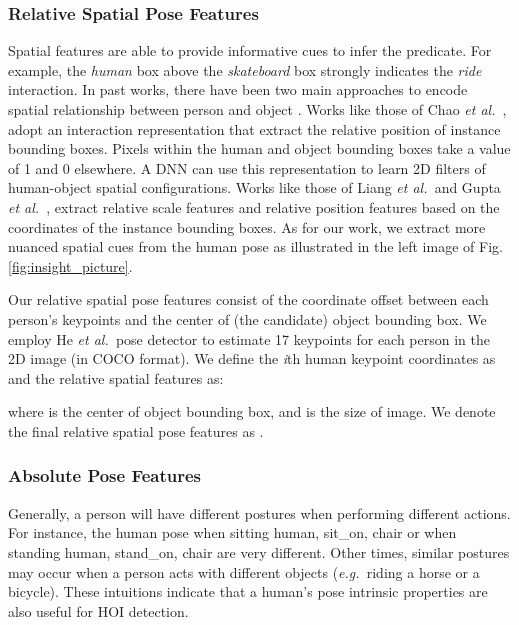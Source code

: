 \documentclass[10pt,twocolumn,letterpaper]{article}
\newcommand{\eg}{{\em e.g.\ }}
\newcommand{\et}{{\em et al.\ }}
\begin{document}
\subsubsection{Relative Spatial Pose Features}\label{subsubsec:rel_pose_feat} 
Spatial features are able to provide informative cues to infer the predicate. For example, the \textit{human} box above the \textit{skateboard} box strongly indicates the \textit{ride} interaction. 
In past works, there have been two main approaches to encode spatial relationship between person and object \cite{chao2018learning,gao2018ican,Li_2019_CVPR,wan2019pose}. 
Works like those of Chao \et \cite{chao2018learning}, adopt an interaction representation that extract the relative position of instance bounding boxes. Pixels within the human and object bounding boxes take a value of 1 and 0 elsewhere.  A DNN can use this representation to learn 2D filters of human-object spatial configurations. 
Works like those of Liang \et and Gupta \et \cite{liang2020visualsemantic,gupta2018nofrills}, extract relative scale features and relative position features based on the coordinates of the instance bounding boxes. 
As for our work, we extract more nuanced spatial cues from the human pose as illustrated in the left image of Fig. \ref{fig:insight_picture}.

Our relative spatial pose features consist of the coordinate offset between each person's keypoints and the center of (the candidate) object bounding box. We employ He \et pose detector \cite{He_mark_rcnn2017} to estimate 17 keypoints for each person in the 2D image (in COCO \cite{Lin2014MicrosoftContext} format). We define the \textit{i}th human keypoint coordinates as  and the relative spatial features  as:

where  is the center of object bounding box, and  is the size of image. We denote the final  relative spatial pose features as . 

\subsubsection{Absolute Pose Features}\label{subsubsec:abs_pose_feat}
Generally, a person will have different postures when performing different actions. For instance, the human pose when sitting human, sit\_on, chair or when standing human, stand\_on, chair are very different. Other times, similar postures may occur when a person acts with different objects (\eg riding a horse or a bicycle). These intuitions indicate that a human's pose intrinsic properties are also useful for HOI detection. 
\end{document}
